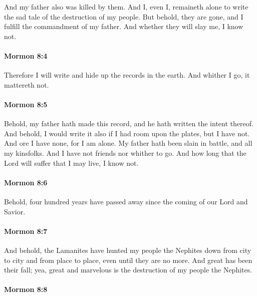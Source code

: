 			And my father also was killed by them.
			And I, even I, remaineth alone
			to write the sad tale of the destruction of my people.
			But behold, they are gone,
			and I fulfill the commandment of my father.
			And whether they will slay me, I know not.

		\paragraph{Mormon 8:4} %
			\label{MORMON-8-4}

			Therefore I will write and hide up the records in the earth.
			And whither I go, it mattereth not.

		\paragraph{Mormon 8:5} %
			\label{MORMON-8-5}

			Behold, my father hath made this record,
			and he hath written the intent thereof.
			And behold, I would write it also
			if I had room upon the plates,
			but I have not.
			And ore I have none,
			for I am alone.
			My father hath been slain in battle,
			and all my kinsfolks.
			And I have not friends nor whither to go.
			And how long that the Lord will suffer that I may live, I know not.

		\paragraph{Mormon 8:6} %
			\label{MORMON-8-6}

			Behold, four hundred years have passed away
			since the coming of our Lord and Savior.

		\paragraph{Mormon 8:7} %
			\label{MORMON-8-7}

			And behold, the Lamanites have hunted my people the Nephites down
			from city to city and from place to place,
			even until they are no more.
			And great has been their fall;
			yea, great and marvelous is the destruction of my people the Nephites.

		\paragraph{Mormon 8:8} %
			\label{MORMON-8-8}

